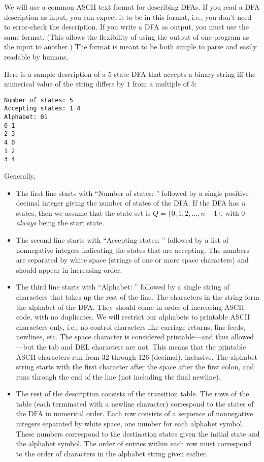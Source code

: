 \documentclass[11pt]{article}
\begin{document}
We will use a common ASCII text format for describing DFAs.  If you
read a DFA description as input, you can expect it to be in this
format, i.e., you don't need to error-check the description.  If you
write a DFA as output, you must use the same format.  (This allows the
flexibility of using the output of one program as the input to
another.)  The format is meant to be both simple to parse and easily
readable by humans.

Here is a sample description of a $5$-state DFA that accepts a binary
string iff the numerical value of the string differs by $1$ from a
multiple of $5$:
\begin{verbatim}
Number of states: 5
Accepting states: 1 4
Alphabet: 01
0 1
2 3
4 0
1 2
3 4
\end{verbatim}

Generally,
\begin{itemize}
  \item
    The first line starts with ``Number of states: '' followed by a
    single positive decimal integer giving the number of states of the
    DFA\@.  If the DFA has $n$ states, then we assume that the state
    set is $Q = \{0,1,2,\ldots, n-1\}$, with $0$ \emph{always} being
    the start state.
  \item
    The second line starts with ``Accepting states: '' followed by a
    list of nonnegative integers indicating the states that are
    accepting.  The numbers are separated by white space (strings of
    one or more space characters) and should appear in increasing
    order.
  \item
    The third line starts with ``Alphabet: '' followed by a single
    string of characters that takes up the rest of the line.  The
    characters in the string form the alphabet of the DFA\@.  They
    should come in order of increasing ASCII code, with no duplicates.
    We will restrict our alphabets to printable ASCII characters only,
    i.e., no control characters like carriage returns, line feeds,
    newlines, etc.  The space character is considered printable---and
    thus allowed---but the tab and DEL characters are not.  This means
    that the printable ASCII characters run from 32 through 126
    (decimal), inclusive.  The alphabet string starts with the first
    character after the space after the first colon, and runs through
    the end of the line (not including the final newline).
  \item
    The rest of the description consists of the transition table.  The
    rows of the table (each terminated with a newline character)
    correspond to the states of the DFA in numerical order.  Each row
    consists of a sequence of nonnegative integers separated by white
    space, one number for each alphabet symbol.  These numbers
    correspond to the destination states given the initial state and
    the alphabet symbol.  The order of entries within each row must
    correspond to the order of characters in the alphabet string given
    earlier.
\end{itemize}
\end{document}
